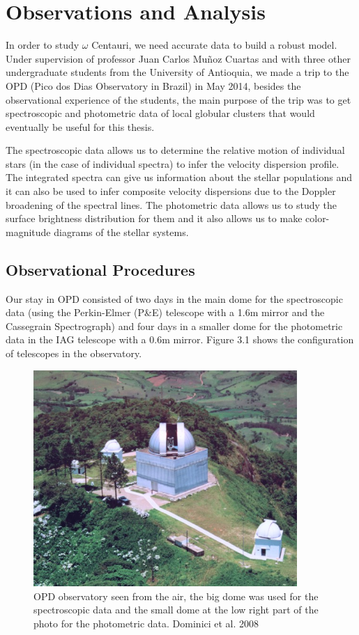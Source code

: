 
\chapter{Observations and Analysis}

In order to study $\omega$ Centauri, we need accurate data to build a robust model. Under supervision of professor Juan Carlos Mu\~noz Cuartas and with three other undergraduate students from the University of Antioquia, we made a trip to the OPD (Pico dos Dias Observatory in Brazil) in May 2014, besides the observational experience of the students, the main purpose of the trip was to get spectroscopic and photometric data of local globular clusters that would eventually be useful for this thesis.

The spectroscopic data allows us to determine the relative motion of individual stars (in the case of individual spectra) to infer the velocity dispersion profile. The integrated spectra can give us information about the stellar populations and it can also be used to infer composite velocity dispersions due to the Doppler broadening of the spectral lines. The photometric data allows us to study the surface brightness distribution for them and it also allows us to make color-magnitude diagrams of the stellar systems.

\section{Observational Procedures}

Our stay in OPD consisted of two days in the main dome for the spectroscopic data (using the Perkin-Elmer (P\&E) telescope with a 1.6m mirror and the Cassegrain Spectrograph) and four days in a smaller dome for the photometric data in the IAG telescope with a 0.6m mirror. Figure 3.1 shows the configuration of telescopes in the observatory.

\begin{figure}[]
\centering
\includegraphics[width=10cm]{images/opd.jpg}
\caption[OPD Observatory]{OPD observatory seen from the air, the big dome was used for the spectroscopic data and the small dome at the low right part of the photo for the photometric data. Dominici et al. 2008}
\end{figure}

